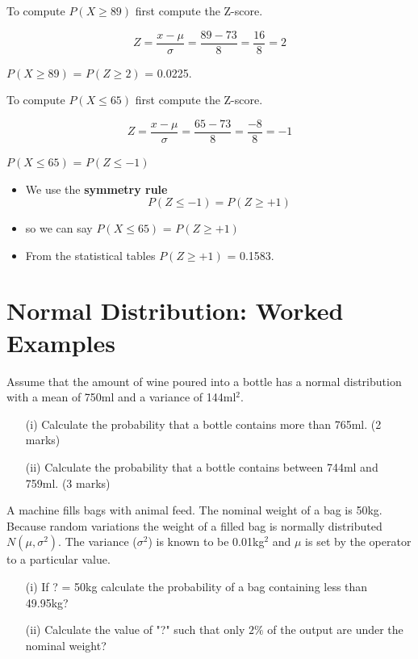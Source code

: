 \documentclass[]{report}
\begin{document}
	To compute $P(X \geq 89)$ first compute the Z-score.
	
	\[ Z = \frac{x - \mu}{\sigma} = \frac{89 - 73}{8} =\frac{16}{8} = 2 \]
	
	$P(X \geq 89)$ = $P(Z \geq 2)$ = 0.0225.
	
	To compute $P(X \leq 65)$ first compute the Z-score.
	
	\[ Z = \frac{x - \mu}{\sigma} = \frac{65 - 73}{8} =\frac{-8}{8} = -1 \]
	
	$P(X \leq 65)$ = $P(Z \leq -1)$ 
	
	\begin{itemize}
		\item We use the \textbf{symmetry rule}
		\[ P(Z \leq -1) = P(Z \geq +1) \]
		\item so we can say $P(X \leq 65)$ = $P(Z \geq +1)$ 
		\item From the statistical tables $P(Z \geq +1)$ = 0.1583.
	\end{itemize}


	

	
	

	\section{Normal Distribution: Worked Examples}
	
	Assume that the amount of wine poured into a bottle has a normal distribution with a mean of 750ml and a variance of 144ml$^2$.
	
	\begin{itemize}
		
		\item[(i)]  Calculate the probability that a bottle contains more than 765ml. (2 marks)
		\item[(ii)]    Calculate the probability that a bottle contains between 744ml and 759ml. (3 marks)
	\end{itemize}
	A machine fills bags with animal feed. The nominal weight of a bag is 50kg.
	Because random variations the weight of a filled bag is normally distributed
	$N(\mu, \sigma^2)$. The variance ($\sigma^2$) is known to be 0.01kg$^2$ and $\mu$ is set by the
	operator to a particular value.
	
	\begin{itemize}
		\item[(i)] If ? = 50kg calculate the probability of a bag containing less than
		49.95kg?
		\item[(ii)] Calculate the value of "?" such that only $2\%$ of the output are under the
		nominal weight?
	\end{itemize}
	
\end{document}
